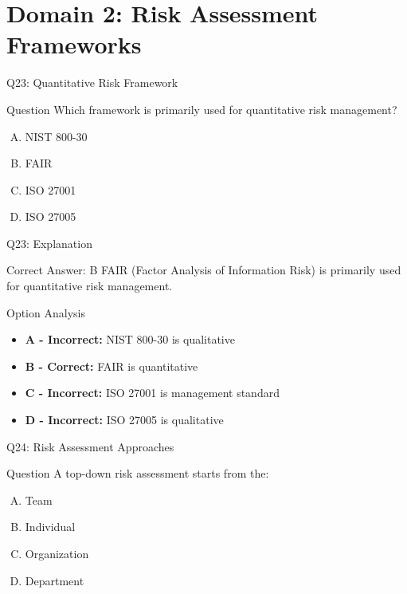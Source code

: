 \documentclass{beamer}
\begin{document}
	\section{Domain 2: Risk Assessment Frameworks}
	
	\begin{frame}{Q23: Quantitative Risk Framework}
		\begin{block}{Question}
			Which framework is primarily used for quantitative risk management?
		\end{block}
		\begin{enumerate}[(A)]
			\item NIST 800-30
			\item FAIR
			\item ISO 27001
			\item ISO 27005
		\end{enumerate}
	\end{frame}
	
	\begin{frame}{Q23: Explanation}
		\begin{block}{Correct Answer: B}
			FAIR (Factor Analysis of Information Risk) is primarily used for quantitative risk management.
		\end{block}
		\begin{block}{Option Analysis}
			\begin{itemize}
				\item \textbf{A - Incorrect:} NIST 800-30 is qualitative
				\item \textbf{B - Correct:} FAIR is quantitative
				\item \textbf{C - Incorrect:} ISO 27001 is management standard
				\item \textbf{D - Incorrect:} ISO 27005 is qualitative
			\end{itemize}
		\end{block}
	\end{frame}
	
	\begin{frame}{Q24: Risk Assessment Approaches}
		\begin{block}{Question}
			A top-down risk assessment starts from the:
		\end{block}
		\begin{enumerate}[(A)]
			\item Team
			\item Individual
			\item Organization
			\item Department
		\end{enumerate}
	\end{frame}
	
\end{document}
